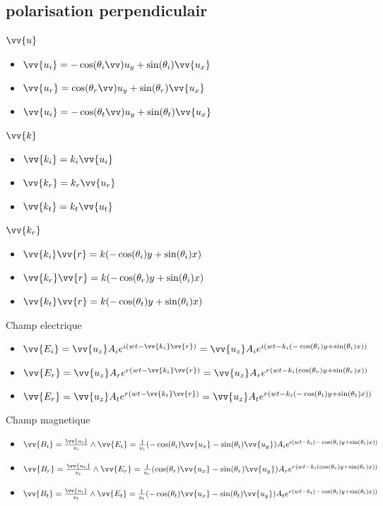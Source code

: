 \documentclass[12pt]{book}
\begin{document}
            \subsection{polarisation perpendiculair}
                $\vv{u}$
                \begin{itemize}
                    \item $\vv{u_i} = -\cos(\theta_i\vv){u_y} + \sin(\theta_i)\vv{u_x}$
                    \item $\vv{u_r} = \cos(\theta_r\vv){u_y} + \sin(\theta_r)\vv{u_x}$
                    \item $\vv{u_i} = -\cos(\theta_t\vv){u_y} + \sin(\theta_t)\vv{u_x}$
                \end{itemize}
                $\vv{k}$
                \begin{itemize}
                    \item $\vv{k_i} = k_i\vv{u_i}$
                    \item $\vv{k_r} = k_r\vv{u_r}$
                    \item $\vv{k_t} = k_t\vv{u_t}$
                \end{itemize}
                $\vv{k_r}$
                \begin{itemize}
                    \item $\vv{k_i}\vv{r} = k(-\cos(\theta_i)y+\sin(\theta_i)x)$
                    \item $\vv{k_r}\vv{r} = k(-\cos(\theta_r)y+\sin(\theta_i)x)$
                    \item $\vv{k_t}\vv{r} = k(-\cos(\theta_t)y+\sin(\theta_i)x)$
                \end{itemize}
                Champ electrique
                \begin{itemize}
                    \item $ \vv{E_i} = \vv{u_z}A_ie^{i(wt-\vv{k_i}\vv{r})} =\vv{u_z}A_ie^{i(wt-k_i(-\cos(\theta_i)y +\sin(\theta_i)x))}$
                    \item $ \vv{E_r} = \vv{u_z}A_re^{r(wt-\vv{k_i}\vv{r})} =\vv{u_z}A_re^{r(wt-k_i(\cos(\theta_r)y +\sin(\theta_r)x))}$
                    \item $ \vv{E_r} = \vv{u_z}A_te^{r(wt-\vv{k_t}\vv{r})} =\vv{u_z}A_te^{r(wt-k_t(-\cos(\theta_t)y +\sin(\theta_t)x))}$
                \end{itemize}
                Champ magnetique
                \begin{itemize}
                    \item $\vv{B_i} = \frac{\vv{u_i}}{v_i}\wedge\vv{E_i} =\frac{1}{v_i}(-\cos(\theta_i)\vv{u_x}-\sin(\theta_i)\vv{u_y})A_ie^{i(wt-k_i(-\cos(\theta_i)y +\sin(\theta_i)x))}$
                    \item $\vv{B_r} = \frac{\vv{u_r}}{v_r}\wedge\vv{E_r} =\frac{1}{v_r}(\cos(\theta_r)\vv{u_x}-\sin(\theta_r)\vv{u_y})A_re^{r(wt-k_i(\cos(\theta_r)y +\sin(\theta_r)x))}$
                    \item $\vv{B_t} = \frac{\vv{u_i}}{v_t}\wedge\vv{E_t} =\frac{1}{v_t}(-\cos(\theta_t)\vv{u_x}-\sin(\theta_t)\vv{u_y})A_te^{r(wt-k_t(-\cos(\theta_t)y +\sin(\theta_t)x))}$
                \end{itemize}
\end{document}
